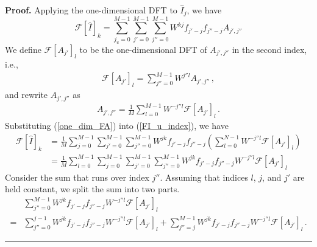 \documentclass[12pt]{CSUNthesis}
\newenvironment{proof}[1][Proof]{\noindent\textbf{#1.} }{\newline \hspace*{\textwidth}\hspace*{-0,4cm} \rule{0.5em}{0.5em} \vspace{0,2cm}}
\def\calF{\mathcal{F}}
\begin{document}
\begin{proof}
Applying the one-dimensional DFT to $\hat{I}_j$, we have
\begin{equation}
\label{FI_u_index}
\calF[\hat{I}]_k = \sum^{M-1}_{j_u=0} \sum^{M-1}_{j'=0} \sum^{M-1}_{j''=0} W^{k j } f_{j'-j}f_{j''-j}A_{j',j''}
\end{equation}
We define $\calF[A_{j'}]_{l}$ to be the one-dimensional DFT of $A_{j',j''}$ in the second index, i.e.,
\begin{align*}
\calF[A_{j'}]_{l} = \sum_{j''=0}^{M-1} W^{ j'' l} A_{j',j''}\, ,
\end{align*}
and rewrite $A_{j',j''}$ as
\begin{align}
\label{one_dim_FA}
A_{j',j''}= \frac{1}{M} \sum_{l=0}^{M-1} W^{ -j'' l} \calF[A_{j'}]_{l}\, .
\end{align}
Substituting (\ref{one_dim_FA}) into (\ref{FI_u_index}), we have
\begin{align}
\label{original}
\calF [\hat{I}]_k &= \frac{1}{M} \sum_{j=0}^{M-1} \sum_{j'=0}^{M-1} \sum_{j''=0}^{M-1} W^{jk} f_{j'-j}f_{j''-j}
\left( \sum_{l=0}^{N-1} W^{-j'' l} \calF[A_{j'}]_{l} \right)  \nonumber \\
&= \frac{1}{M} \sum_{l=0}^{M-1} \sum_{j=0}^{M-1} \sum_{j'=0}^{M-1} \sum_{j''=0}^{M-1} W^{jk} f_{j'-j}f_{j''-j} W^{-j'' l } \calF[A_{j'}]_{l} 
\end{align}
Consider the sum that runs over index $j''$. Assuming that indices $l$, $j$, and $j'$ are held constant, we split the sum into two parts.
\begin{align}
\label{j''_split}
&\sum_{j''=0}^{M-1} W^{jk} f_{j'-j}f_{j''-j} W^{-j'' l } \calF[A_{j'}]_{l}  \nonumber \\
=&\sum_{j''=0}^{j-1} W^{jk} f_{j'-j}f_{j''-j} W^{-j'' l } \calF[A_{j'}]_{l} + \sum_{j''=j}^{M-1} W^{jk} f_{j'-j}f_{j''-j} W^{-j'' l } \calF[A_{j'}]_{l} \, .
\end{align}


\end{proof}
\end{document}
